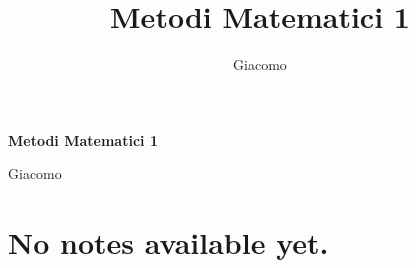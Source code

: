 \documentclass{article}
\title{Metodi Matematici 1}
\author{Giacomo}
\begin{document}
\begin{titlepage}
    

    \centering
    {\Huge\bfseries Metodi Matematici 1\par}
    \vspace{1.5cm}
    {\large Giacomo\par}
\end{titlepage}





\section*{No notes available yet.}
\end{document}
